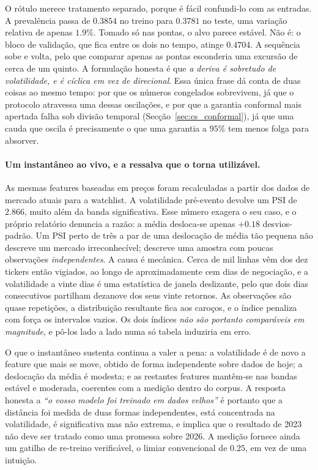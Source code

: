 O rótulo merece tratamento separado, porque é fácil confundi-lo com as entradas. A prevalência passa
de $0.3854$ no treino para $0.3781$ no teste, uma variação relativa de apenas $1.9\%$. Tomado só nas
pontas, o alvo parece estável. Não é: o bloco de validação, que fica entre os dois no tempo, atinge
$0.4704$. A sequência sobe e volta, pelo que comparar apenas as pontas esconderia uma excursão de
cerca de um quinto. A formulação honesta é que \emph{a deriva é sobretudo de volatilidade, e é
cíclica em vez de direcional}. Essa única frase dá conta de duas coisas ao mesmo tempo: por que os
números congelados sobrevivem, já que o protocolo atravessa uma dessas oscilações, e por que a
garantia conformal mais apertada falha sob divisão temporal (Secção~\ref{sec:cs_conformal}), já que
uma cauda que oscila é precisamente o que uma garantia a $95\%$ tem menos folga para absorver.

\paragraph{Um instantâneo ao vivo, e a ressalva que o torna utilizável.} As mesmas features baseadas
em preços foram recalculadas a partir dos dados de mercado atuais para a watchlist. A volatilidade
pré-evento devolve um PSI de $2.866$, muito além da banda significativa. Esse número exagera o seu
caso, e o próprio relatório denuncia a razão: a média desloca-se apenas $+0.18$ desvios-padrão. Um
PSI perto de três a par de uma deslocação de média tão pequena não descreve um mercado
irreconhecível; descreve uma amostra com poucas observações \emph{independentes}. A causa é mecânica.
Cerca de mil linhas vêm dos dez tickers então vigiados, ao longo de aproximadamente cem dias de negociação, e a
volatilidade a vinte dias é uma estatística de janela deslizante, pelo que dois dias consecutivos
partilham dezanove dos seus vinte retornos. As observações são quase repetições, a distribuição
resultante fica aos caroços, e o índice penaliza com força os intervalos vazios. Os dois índices
\emph{não são portanto comparáveis em magnitude}, e pô-los lado a lado numa só tabela induziria em
erro.

O que o instantâneo sustenta continua a valer a pena: a volatilidade é de novo a feature que mais se
move, obtido de forma independente sobre dados de hoje; a deslocação da média é modesta; e as
restantes features mantêm-se nas bandas estável e moderada, coerentes com a medição dentro do corpus.
A resposta honesta a \emph{``o vosso modelo foi treinado em dados velhos''} é portanto que a
distância foi medida de duas formas independentes, está concentrada na volatilidade, é significativa
mas não extrema, e implica que o resultado de 2023 não deve ser tratado como uma promessa sobre 2026.
A medição fornece ainda um gatilho de re-treino verificável, o limiar convencional de $0.25$, em vez
de uma intuição.

